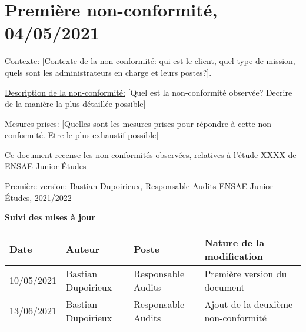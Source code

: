 \documentclass[12pt]{article}
\begin{document}

\bigskip

\section{Première non-conformité, 04/05/2021}
\underline{Contexte:} [Contexte de la non-conformité: qui est le client, quel type de mission, quels sont les administrateurs en charge et leurs postes?].


\bigskip

\underline{Description de la non-conformité:} [Quel est la non-conformité observée? Decrire de la manière la plus détaillée possible]

\bigskip

\underline{Mesures prises:} [Quelles sont les mesures prises pour répondre à cette non-conformité. Etre le plus exhaustif possible]



\newpage

\large{Ce document recense les non-conformités observées, relatives à l'étude XXXX de ENSAE Junior Études}

Première version: Bastian Dupoirieux, Responsable Audits ENSAE Junior Études, 2021/2022

\bigskip

\bigskip

\textcolor{rouge_eje}{\textbf{Suivi des mises à jour}}


\begin{center}
\begin{tabular}{|p{2.5cm} | p{5cm} | p{5cm}|p{5cm}|}
\hline
Date & Auteur & Poste & Nature de la modification \\
\hline
10/05/2021 & Bastian Dupoirieux & Responsable Audits & Première version du document\\
\hline
13/06/2021 & Bastian Dupoirieux & Responsable Audits & Ajout de la deuxième non-conformité\\
\hline
\end{tabular}
\end{center}
\end{document}
